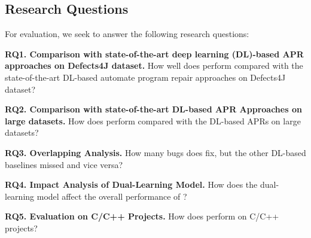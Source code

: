\subsection{Research Questions}

For evaluation, we seek to answer the following research questions:

\noindent\textbf{RQ1. Comparison with state-of-the-art deep learning
  (DL)-based APR approaches on Defects4J dataset.}  How well does
                {\tool} perform compared with the state-of-the-art
               DL-based automate program repair approaches on Defects4J
                dataset?


\noindent\textbf{RQ2. Comparison with state-of-the-art DL-based APR Approaches on large datasets.}  
How does {\tool} perform compared with the DL-based APRs on large datasets?


\noindent\textbf{RQ3. Overlapping Analysis.} How many bugs does
{\tool} fix, but the other DL-based baselines
                missed and vice versa?

\noindent\textbf{RQ4. Impact Analysis of Dual-Learning Model.} How does the dual-learning model affect the overall performance of {\tool}?


\noindent\textbf{RQ5. Evaluation on C/C++ Projects.} How does {\tool} perform on C/C++ projects?
